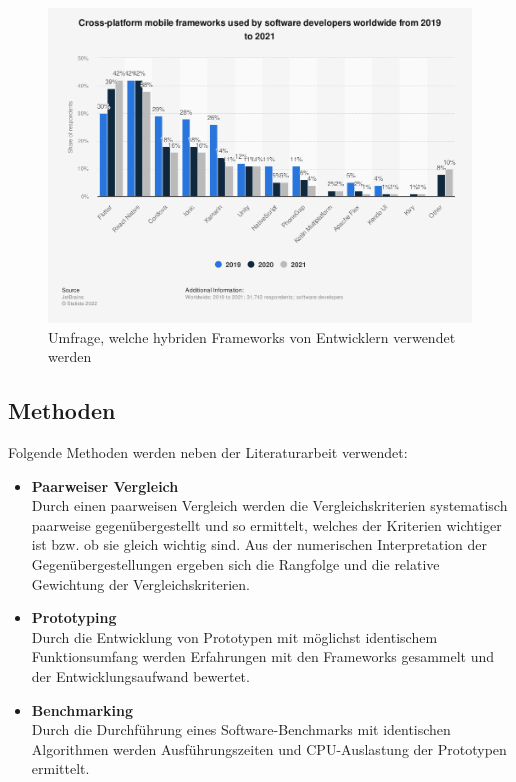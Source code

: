 \documentclass[]{lni}
\begin{document}
\begin{figure}[h]
	\centering
	\includegraphics[width=\linewidth]{images/statistik_frameworks.png}
	\caption{Umfrage, welche hybriden Frameworks von Entwicklern verwendet werden \cite{Statista.21.10.2022}}
	\label{fig:statistikFrameworks}
\end{figure}


\subsection{Methoden}
Folgende Methoden werden neben der Literaturarbeit verwendet:
\begin{itemize}
	\item \textbf{Paarweiser Vergleich} \\
		Durch einen paarweisen Vergleich werden die Vergleichskriterien systematisch paarweise gegenübergestellt und so ermittelt, welches der Kriterien wichtiger ist bzw. ob sie gleich wichtig sind. Aus der numerischen Interpretation der Gegenübergestellungen ergeben sich die Rangfolge und die relative Gewichtung der Vergleichskriterien.
	\item \textbf{Prototyping} \\
		Durch die Entwicklung von Prototypen mit möglichst identischem Funktionsumfang werden Erfahrungen mit den Frameworks gesammelt und der Entwicklungsaufwand bewertet.
	\item \textbf{Benchmarking} \\
		Durch die Durchführung eines Software-Benchmarks mit identischen Algorithmen werden Ausführungszeiten und CPU-Auslastung der Prototypen ermittelt.
\end{itemize}
\end{document}
